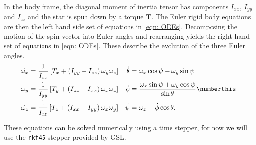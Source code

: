 \documentclass[/home/greg/Thesis/main/main.tex]{subfiles}
\begin{document}
In the body frame, the diagonal moment of inertia tensor has components
$I_{xx}$, $I_{yy}$ and $I_{zz}$ and the star is spun down by a torque
$\boldsymbol{T}$. The Euler rigid body equations are then the left hand side
set of equations in \eqref{eqn: ODEs}. Decomposing the motion of the spin
vector into Euler angles and rearranging yields the right hand set of equations
in \eqref{eqn: ODEs}. These describe the evolution of the three Euler angles.
\begin{align*}
\dot{\omega_{x}} & = \frac{1}{I_{xx}}\left[T_{x} + 
                      \left(I_{yy} - I_{zz}\right) \omega_{y} \omega_{z}\right] 
& 
\dot{\theta} & = \omega_{x} \cos \psi - \omega_{y} \sin \psi
\\
\dot{\omega_{y}} & = \frac{1}{I_{yy}}\left[T_{y} + 
                      \left(I_{zz} - I_{xx}\right) \omega_{x} \omega_{z}\right] 
& 
\dot{\phi} & = \frac{\omega_{x} \sin \psi + \omega_{y} \cos \psi}{\sin \theta}
\numberthis \label{eqn: ODEs}
\\
\dot{\omega_{z}} & =\frac{1}{I_{zz}}\left[T_{z} + 
                      \left(I_{xx} - I_{yy}\right) \omega_{x} \omega_{y}\right]
& 
\dot{\psi} & = \omega_{z} - \dot{\phi} \cos \theta.
\end{align*}

These equations can be solved numerically using a time stepper, for now
we will use the \texttt{rkf45} stepper provided by GSL. %

\end{document}
